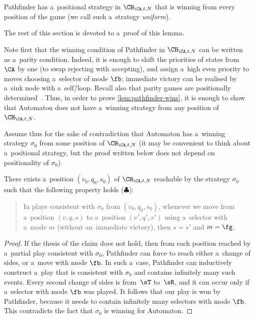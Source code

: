 \begin{lem}\label{lem:pathfinder-wins}
	Pathfinder has a~positional strategy in $\CH_{\CA,t,N}$ that is winning from every position of the game (we call such a~strategy \emph{uniform}).
\end{lem}
\noindent %
The rest of this section is devoted to a~proof of this lemma.

Note first that the winning condition of Pathfinder in $\CH_{\CA,t,N}$ can be written as a~parity condition.
Indeed, it is enough to shift the priorities of states from $\CA$ by one (to swap rejecting with accepting), and assign a~high even priority to moves choosing a~selector of mode $\fb$;
immediate victory can be realised by a~sink node with a~self\=/loop.
Recall also that parity games are positionally determined~\cite{jutla_determinacy,mostowski_parity_games}.
Thus, in order to prove \cref{lem:pathfinder-wins}, it is enough to show that Automaton does not have a~winning strategy from any position of~$\CH_{\CA,t,N}$.

Assume thus for the sake of contradiction that Automaton has a~winning strategy $\sigma_0$ from some position of $\CH_{\CA,t,N}$
(it may be convenient to think about a~positional strategy, but the proof written below does not depend on positionality of $\sigma_0$).

\begin{clm}
\label{cl:no-change-sides}
	There exists a~position $(v_0,q_0,s_0)$ of $\CH_{\CA,t,N}$ reachable by the strategy $\sigma_0$ such that the following property holds ($\clubsuit$):
	\begin{quote}
		In plays consistent with $\sigma_0$ from $(v_0,q_0,s_0)$, whenever we move from a~position $(v,q,s)$ to a~position $(v',q',s')$ using a~selector with a~mode $m$ (without an~immediate victory), then $s=s'$ and $m=\fg$.
	\end{quote}
\end{clm}

\begin{proof}
	If the thesis of the claim does not hold, then from each position reached by a~partial play consistent with $\sigma_0$, Pathfinder can force to reach either a~change of sides,
	or a~move with mode $\fb$.
	In such a~case, Pathfinder can inductively construct a~play that is consistent with $\sigma_0$ and contains infinitely many such events.
	Every second change of sides is from~$\sT$ to~$\sR$, and it can occur only if a~selector with mode $\fb$ was played.
	It follows that our play is won by Pathfinder, because it needs to contain infinitely many selectors with mode $\fb$.
	This contradicts the fact that $\sigma_0$ is winning for Automaton.
\end{proof}

